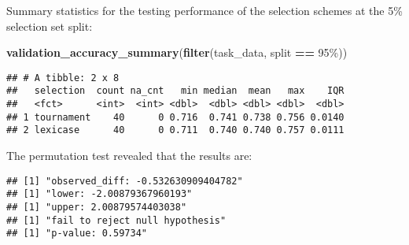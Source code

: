 \documentclass[
]{book}
\newenvironment{Shaded}{\begin{snugshade}}{\end{snugshade}}
\newcommand{\AttributeTok}[1]{\textcolor[rgb]{0.13,0.29,0.53}{#1}}
\newcommand{\DecValTok}[1]{\textcolor[rgb]{0.00,0.00,0.81}{#1}}
\newcommand{\FunctionTok}[1]{\textcolor[rgb]{0.13,0.29,0.53}{\textbf{#1}}}
\newcommand{\NormalTok}[1]{#1}
\newcommand{\OtherTok}[1]{\textcolor[rgb]{0.56,0.35,0.01}{#1}}
\newcommand{\SpecialCharTok}[1]{\textcolor[rgb]{0.81,0.36,0.00}{\textbf{#1}}}
\newcommand{\StringTok}[1]{\textcolor[rgb]{0.31,0.60,0.02}{#1}}
\begin{document}
Summary statistics for the testing performance of the selection schemes at the 5\% selection set split:

\begin{Shaded}
\begin{Highlighting}[]
\FunctionTok{validation\_accuracy\_summary}\NormalTok{(}\FunctionTok{filter}\NormalTok{(task\_data, split }\SpecialCharTok{==} \StringTok{\textquotesingle{}95\%\textquotesingle{}}\NormalTok{))}
\end{Highlighting}
\end{Shaded}

\begin{verbatim}
## # A tibble: 2 x 8
##   selection  count na_cnt   min median  mean   max    IQR
##   <fct>      <int>  <int> <dbl>  <dbl> <dbl> <dbl>  <dbl>
## 1 tournament    40      0 0.716  0.741 0.738 0.756 0.0140
## 2 lexicase      40      0 0.711  0.740 0.740 0.757 0.0111
\end{verbatim}

The permutation test revealed that the results are:

\begin{Shaded}
\end{Shaded}

\begin{verbatim}
## [1] "observed_diff: -0.532630909404782"
## [1] "lower: -2.00879367960193"
## [1] "upper: 2.00879574403038"
## [1] "fail to reject null hypothesis"
## [1] "p-value: 0.59734"
\end{verbatim}
\end{document}
